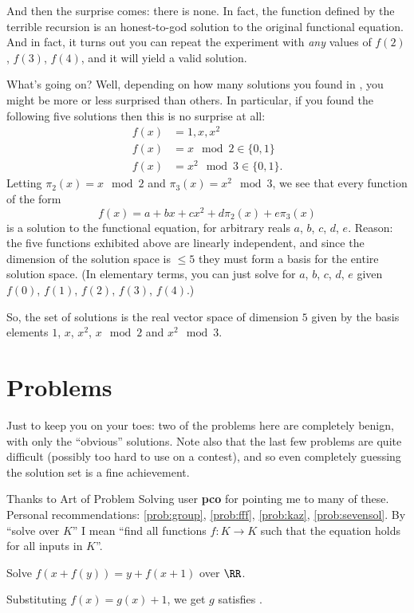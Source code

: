 \documentclass[11pt]{scrartcl}
\begin{document}
And then the surprise comes: there is none.
In fact, the function defined by the terrible recursion
is an honest-to-god solution to the original functional equation.
And in fact, it turns out you can repeat the experiment with \emph{any} values of
$f(2)$, $f(3)$, $f(4)$, and it will yield a valid solution.

What's going on?
Well, depending on how many solutions you found in ,
you might be more or less surprised than others.
In particular, if you found the following five solutions then
this is no surprise at all:
\begin{align*}
  f(x) &= 1, x, x^2 \\
  f(x) &= x \mod 2 \in \{0,1\}\\
  f(x) &= x^2 \mod 3 \in \{0,1\}.
\end{align*}
Letting $\pi_2(x) = x \mod 2$ and $\pi_3(x) = x^2 \mod 3$, we see that
every function of the form
\[ f(x) = a + bx + cx^2 + d\pi_2(x) + e\pi_3(x) \]
is a solution to the functional equation,
for arbitrary reals $a$, $b$, $c$, $d$, $e$.
Reason: the five functions exhibited above are linearly independent,
and since the dimension of the solution space is $\le 5$
they must form a basis for the entire solution space.
(In elementary terms, you can just solve for $a$, $b$, $c$, $d$, $e$
given $f(0)$, $f(1)$, $f(2)$, $f(3)$, $f(4)$.)

So, the set of solutions is the real vector space of dimension $5$
given by the basis elements $1$, $x$, $x^2$, $x \mod 2$ and $x^2 \mod 3$.

\section{Problems}
Just to keep you on your toes: two of the problems here are completely benign,
with only the ``obvious'' solutions.
Note also that the last few problems are quite difficult (possibly too hard to use on a contest),
and so even completely guessing the solution set is a fine achievement.

Thanks to Art of Problem Solving user \textbf{pco} for pointing me to many of these.
Personal recommendations:
\ref{prob:group}, \ref{prob:fff}, \ref{prob:kaz}, \ref{prob:sevensol}.
By ``solve over $K$'' I mean ``find all functions $f \colon K \to K$
such that the equation holds for all inputs in $K$''.

\begin{problem}
  Solve $f(x+f(y))=y+f(x+1)$ over $\RR$.
  \begin{hint}
    Substituting $f(x) = g(x) + 1$, we get $g$ satisfies .
  \end{hint}
\end{problem}
\end{document}
